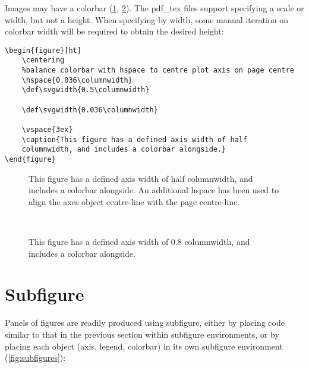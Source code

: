 \documentclass{article}
\begin{document}
Images may have a colorbar (\ref{fig:peakscbar050w}, \ref{fig:peakscbar085w}). The pdf\_tex files support specifying a scale or width, but not a height. When specifying by width, some manual iteration on colorbar width will be required to obtain the desired height:
\begin{verbatim}
\begin{figure}[ht]
    \centering
    %balance colorbar with hspace to centre plot axis on page centre
    \hspace{0.036\columnwidth} 
    \def\svgwidth{0.5\columnwidth}
    
    \def\svgwidth{0.036\columnwidth}
    
    \vspace{3ex}
    \caption{This figure has a defined axis width of half
    columnwidth, and includes a colorbar alongside.}
\end{figure}
\end{verbatim}

\begin{figure}[ht]
    \centering
    \hspace{0.036\columnwidth}
    \def\svgwidth{0.5\columnwidth}
    
    \def\svgwidth{0.036\columnwidth}
    
    \vspace{3ex}
    \caption{This figure has a defined axis width of half columnwidth,
    and includes a colorbar alongside. An additional hspace has been
    used to align the axes object centre-line with the page centre-line.}
    \label{fig:peakscbar050w}
\end{figure}

\begin{figure}[ht]
    \centering
    \hspace{0.0576\columnwidth}
    \def\svgwidth{0.8\columnwidth}
    
    \def\svgwidth{0.0576\columnwidth}
    \\
    \vspace{3ex}
    \caption{This figure has a defined axis width of 0.8 columnwidth, and includes a colorbar alongside.}
    \label{fig:peakscbar085w}
\end{figure}

\section{Subfigure}
Panels of figures are readily produced using subfigure, either by placing code similar to that in the previous section within subfigure environments, or by placing each object (axis, legend, colorbar) in its own subfigure environment (\ref{fig:subfigures}): 
\end{document}
